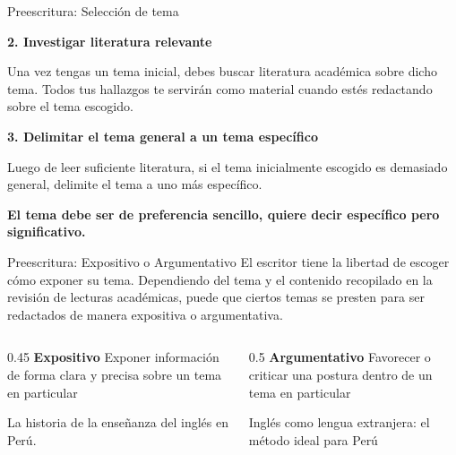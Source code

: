 \documentclass[
11pt, %
]{beamer}
\begin{document}
\begin{frame}{Preescritura: Selección de tema}

	\textbf{2. Investigar literatura relevante}

	Una vez tengas un tema inicial, debes buscar literatura académica sobre dicho
	tema. Todos tus hallazgos te servirán como material cuando estés redactando
	sobre el tema escogido.

	\vspace{0.5cm}

	\textbf{3. Delimitar el tema general a un tema específico}

	Luego de leer suficiente literatura, si el tema inicialmente escogido es
	demasiado general, delimite el tema a uno más específico.

	\vspace{0.5cm}

	\textbf{El tema debe ser de preferencia sencillo, quiere decir específico pero significativo.}

\end{frame}

\begin{frame}{Preescritura: Expositivo o Argumentativo}
	El escritor tiene la libertad de escoger cómo exponer su tema.
	Dependiendo del tema y el contenido recopilado en la revisión de lecturas
	académicas, puede que ciertos temas se presten para ser redactados de manera
	expositiva o argumentativa.

	\vspace{0.5cm}

	\begin{columns}[c]
		\begin{column}{0.45\textwidth}
			\textbf{Expositivo}
			Exponer información de forma clara y
			precisa sobre un tema en particular
			\begin{block}{}
				La historia de la enseñanza del inglés en Perú.
			\end{block}
		\end{column}
		\begin{column}{0.5\textwidth}
			\textbf{Argumentativo}
			Favorecer o criticar una postura dentro de un tema en particular
			\begin{block}{}
				Inglés como lengua extranjera: el método ideal para Perú
			\end{block}
		\end{column}
	\end{columns}
\end{frame}
\end{document}
